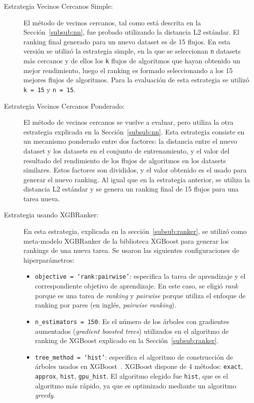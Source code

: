 \begin{description}
	\item[Estrategia Vecinos Cercanos Simple:] El método de vecinos cercanos, tal como está descrita en la Sección~\ref{subsub:nn}, fue probado utilizando la distancia L2 estándar. El ranking final generado para un nuevo dataset es de 15 flujos. En esta versión se utilizó la estrategia simple, en la que se seleccionan \texttt{n} datasets más cercanos y de ellos los \texttt{k} flujos de algoritmos que hayan obtenido un mejor rendimiento, luego el ranking es formado seleccionando a los 15 mejores flujos de algoritmos. Para la evaluación de esta estrategia se utilizó \texttt{k = 15} y \texttt{n = 15}.
	\item[Estrategia Vecinos Cercanos Ponderado:] El método de vecinos cercanos se vuelve a evaluar, pero utiliza la otra estrategia explicada en la Sección~\ref{subsub:nn}. Esta estrategia consiste en un mecanismo ponderado entre dos factores: la distancia entre el nuevo dataset y los datasets en el conjunto de entrenamiento, y el valor del resultado del rendimiento de los flujos de algoritmos en los datasets similares. Estos factores son divididos, y el valor obtenido es el usado para generar el nuevo ranking. Al igual que en la estrategia anterior, se utiliza la distancia L2 estándar y se genera un ranking final de 15 flujos para una tarea nueva.
	\item[Estrategia usando  XGBRanker:] En esta estrategia, explicada en la sección~\ref{subsub:ranker}, se utilizó como meta-modelo XGBRanker de la biblioteca XGBoost para generar los rankings de una nueva tarea. Se usaron las siguientes configuraciones de hiperparámetros: 	
	\begin{itemize}
		\item \texttt{objective = `rank:pairwise'}: especifica la tarea de aprendizaje y el correspondiente objetivo de aprendizaje. En este caso, se eligió \textit{rank} porque es una tarea de \textit{ranking} y \textit{pairwise} porque utiliza el enfoque de ranking por pares (en inglés, \textit{pairwise ranking}).
		\item \texttt{n\_estimators = 150}: Es el número de los árboles con gradientes aumentados (\textit{gradient boosted trees}) utilizados en el algoritmo de ranking de XGBoost explicado en la Sección~\ref{subsub:ranker}.
		\item \texttt{tree\_method = `hist'}: especifica el algoritmo de construcción de árboles usados en XGBoost~\cite{xgboost}. XGBoost dispone de 4 métodos: \texttt{exact}, \texttt{approx}, \texttt{hist}, \texttt{gpu\_hist}. El algoritmo elegido fue \texttt{hist}, que es el algoritmo más rápido, ya que es optimizado mediante un algoritmo \textit{greedy}.

\end{itemize}
\end{description}
